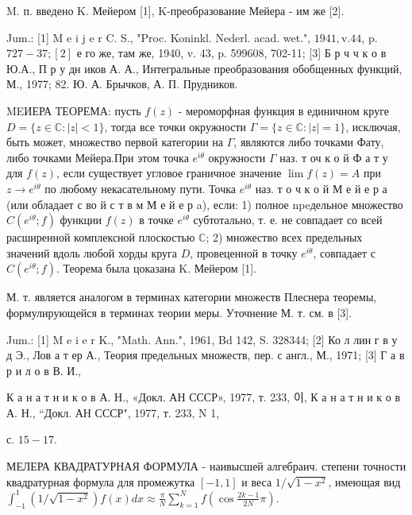 \documentclass[10pt]{article}
\begin{document}
M. п. введено K. Мейером [1], K-преобразование Мейера - им же [2].



Jum.: [1] M e i j e r C. S., "Proc. Koninkl. Nederl. acad. wet.", $1941, \mathrm{v} .44$, p. $727-37 ;[2]$ е го же, там же, 1940, v. 43, p. 599608, 702-11; [3] Б р ч ч к о в Ю.А., П р у дн иков А. А., Интегральные преобразования обобщенных функций, М., 1977; 82. Ю. А. Брычков, А. П. Прудников.



MEИЕРА ТЕОРЕМА: пусть $f(z)$ - мероморфная функция в единичном круге $D=\{z \in \mathbb{C}:|z|<1\}$, тогда все точки окружности $\Gamma=\{z \in \mathbb{C}:|z|=1\}$, исключая, быть может, множество первой категории на $\Gamma$, являются либо точками Фату, либо точками Мейера.При этом точка $e^{i \theta}$ окружности $\Gamma$ наз. т оч к о й Ф а т у для $f(z)$, если существует угловое граничное значение $\lim f(z)=A$ при $z \rightarrow e^{i \theta}$ по любому некасательному пути. Точка $e^{i \theta}$ наз. т о ч к о й М е й е р а (или обладает с во й с т в м М е й е р a), если: 1) полное npeдельное множество $C\left(e^{i \theta} ; f\right)$ функции $f(z)$ в точке $e^{i \theta}$ субтотально, т. е. не совпадает со всей расширенной комплексной плоскостью $\mathbb{C}$; 2) множество всех предельных значений вдоль любой хорды круга $D$, провеценной в точку $e^{i \theta}$, совпадает с $C\left(e^{i \theta} ; f\right)$. Теорема была цоказана $\mathrm{K}$. Мейером [1].



М. т. является аналогом в терминах категории множеств Плеснера теоремы, формулирующейся в терминах теории меры. Уточнение М. т. см. в [3].



Jum.: [1] M e i e r K., "Math. Ann.", 1961, Bd 142, S. 328344; [2] Ко л лин г в у д Э., Лов а т ер А., Теория предельных множеств, пер. с англ., М., 1971; [3] Г а в р и л о в В. И.,

К а н а т н и к о в А. Н., «Докл. АН СССР», 1977, т. 233, 이, К а н а т н и к о в А. Н., “Докл. АН СССР", 1977, т. 233, N 1,

с. $15-17$.



МЕЛЕРА КВАДРАТУРНАЯ ФОРМУЛА - наивысшей алгебраич. степени точности квадратурная формула для промежутка $[-1,1]$ и веса $1 / \sqrt{1-x^{2}}$, имеющая вид $\int_{-1}^{1}\left(1 / \sqrt{1-x^{2}}\right) f(x) d x \approx \frac{\pi}{N} \sum_{k=1}^{N} f\left(\cos \frac{2 k-1}{2 N} \pi\right)$.
\end{document}
